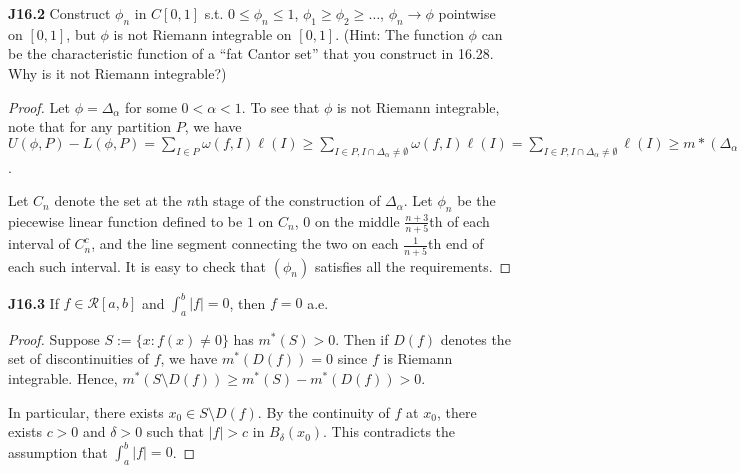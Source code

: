 \documentclass{article}
\newcommand{\p}{\textbf}
\begin{document}
\p{J16.2} Construct $\phi_n$ in $C[0,1]$ s.t. $0\leq \phi_n \leq 1$, $\phi_1 \geq \phi_2 \geq \ldots$, $\phi_n \rightarrow \phi$ pointwise on $[0,1]$, but $\phi$ is not Riemann integrable on $[0,1]$. (Hint: The function $\phi$ can be the characteristic function of a ``fat Cantor set'' that you construct in 16.28. Why is it not Riemann integrable?)
\begin{proof}
Let $\phi = \Delta_\alpha$ for some $0 < \alpha < 1$. To see that $\phi$ is not Riemann integrable, note that for any partition $P$, we have $U(\phi, P) - L(\phi,P) = \sum_{I\in P} \omega(f, I) \ell(I) \geq \sum_{I \in P, I \cap \Delta_\alpha \ne \emptyset} \omega(f,I) \ell(I) = \sum_{I \in P, I \cap \Delta_\alpha \ne \emptyset} \ell(I) \geq m*(\Delta_\alpha) = \alpha$.

Let $C_n$ denote the set at the $n$th stage of the construction of $\Delta_\alpha$. Let $\phi_n$ be the piecewise linear function defined to be $1$ on $C_n$, $0$ on the middle $\frac {n+3} {n+5}$th of each interval of $C_n^c$, and the line segment connecting the two on each $\frac 1 {n+5}$th end of each such interval. It is easy to check that $(\phi_n)$ satisfies all the requirements.
\end{proof}

\p{J16.3} If $f \in \mathcal{R}[a,b]$ and $\int_a^b |f| = 0$, then $f = 0$ a.e.
\begin{proof}
Suppose $S:= \{x : f(x) \neq 0\}$ has $m^*(S) > 0$.  Then if $D(f)$ denotes the set of discontinuities of $f$, we have $m^*(D(f)) = 0$ since $f$ is Riemann integrable. Hence, $m^*(S \setminus D(f)) \geq m^*(S) - m^*(D(f)) > 0$. 

In particular, there exists $x_0 \in S\setminus D(f)$. By the continuity of $f$ at $x_0$, there exists $c > 0$ and $\delta > 0$ such that $|f| > c$ in $B_{\delta}(x_0)$. This contradicts the assumption that $\int_a^b |f| = 0$.
\end{proof}
\end{document}
